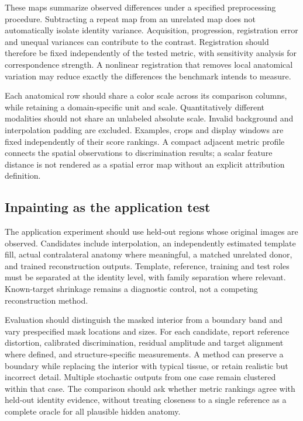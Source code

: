 \documentclass[10pt,twocolumn,letterpaper]{article}
\begin{document}
These maps summarize observed differences under a specified preprocessing procedure. Subtracting a repeat map from an unrelated map does not automatically isolate identity variance. Acquisition, progression, registration error and unequal variances can contribute to the contrast. Registration should therefore be fixed independently of the tested metric, with sensitivity analysis for correspondence strength. A nonlinear registration that removes local anatomical variation may reduce exactly the differences the benchmark intends to measure.

Each anatomical row should share a color scale across its comparison columns, while retaining a domain-specific unit and scale. Quantitatively different modalities should not share an unlabeled absolute scale. Invalid background and interpolation padding are excluded. Examples, crops and display windows are fixed independently of their score rankings. A compact adjacent metric profile connects the spatial observations to discrimination results; a scalar feature distance is not rendered as a spatial error map without an explicit attribution definition.

\subsection{Inpainting as the application test}
The application experiment should use held-out regions whose original images are observed. Candidates include interpolation, an independently estimated template fill, actual contralateral anatomy where meaningful, a matched unrelated donor, and trained reconstruction outputs. Template, reference, training and test roles must be separated at the identity level, with family separation where relevant. Known-target shrinkage remains a diagnostic control, not a competing reconstruction method.

Evaluation should distinguish the masked interior from a boundary band and vary prespecified mask locations and sizes. For each candidate, report reference distortion, calibrated discrimination, residual amplitude and target alignment where defined, and structure-specific measurements. A method can preserve a boundary while replacing the interior with typical tissue, or retain realistic but incorrect detail. Multiple stochastic outputs from one case remain clustered within that case. The comparison should ask whether metric rankings agree with held-out identity evidence, without treating closeness to a single reference as a complete oracle for all plausible hidden anatomy.
\end{document}
